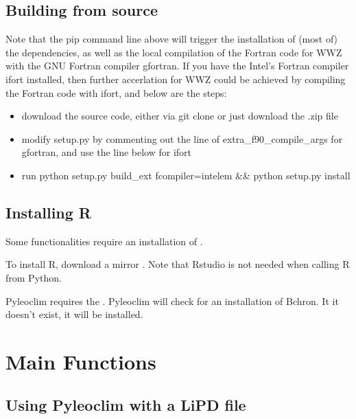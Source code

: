 \documentclass[letterpaper,10pt,english]{sphinxmanual}
\begin{document}
\section{Building from source}
\label{\detokenize{Installation:building-from-source}}
Note that the pip command line above will trigger the installation of (most of) the dependencies, as well as the local compilation of the Fortran code for WWZ with the GNU Fortran compiler gfortran. If you have the Intel’s Fortran compiler ifort installed, then further accerlation for WWZ could be achieved by compiling the Fortran code with ifort, and below are the steps:
\begin{itemize}
\item {} 
download the source code, either via git clone or just download the .zip file

\item {} 
modify setup.py by commenting out the line of extra\_f90\_compile\_args for gfortran, and use the line below for ifort

\item {} 
run python setup.py build\_ext \textendash{}fcompiler=intelem \&\& python setup.py install

\end{itemize}


\section{Installing R}
\label{\detokenize{Installation:installing-r}}
Some functionalities require an installation of .

To install R, download a mirror .
Note that Rstudio is not needed when calling R from Python.

Pyleoclim requires the . Pyleoclim will check for an installation of Bchron. It it doesn’t exist, it will be installed.


\chapter{Main Functions}
\label{\detokenize{Main:main-functions}}\label{\detokenize{Main::doc}}

\section{Using Pyleoclim with a LiPD file}
\label{\detokenize{Main:using-pyleoclim-with-a-lipd-file}}
\end{document}
